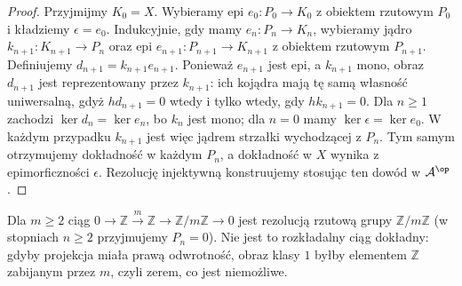 \begin{proof}
Przyjmijmy $K_0=X$. Wybieramy epi $e_0:P_0\to K_0$ z obiektem rzutowym $P_0$ i kładziemy $\epsilon=e_0$. Indukcyjnie, gdy mamy $e_n:P_n\to K_n$, wybieramy jądro $k_{n+1}:K_{n+1}\to P_n$ oraz epi $e_{n+1}:P_{n+1}\to K_{n+1}$ z obiektem rzutowym $P_{n+1}$. Definiujemy $d_{n+1}=k_{n+1}e_{n+1}$. Ponieważ $e_{n+1}$ jest epi, a $k_{n+1}$ mono, obraz $d_{n+1}$ jest reprezentowany przez $k_{n+1}$: ich kojądra mają tę samą własność uniwersalną, gdyż $hd_{n+1}=0$ wtedy i tylko wtedy, gdy $hk_{n+1}=0$.
Dla $n\ge1$ zachodzi $\ker d_n=\ker e_n$, bo $k_n$ jest mono; dla $n=0$ mamy $\ker\epsilon=\ker e_0$. W każdym przypadku $k_{n+1}$ jest więc jądrem strzałki wychodzącej z $P_n$. Tym samym otrzymujemy dokładność w każdym $P_n$, a dokładność w $X$ wynika z epimorficzności $\epsilon$. Rezolucję injektywną konstruujemy stosując ten dowód w $\mathcal A^{\op}$.
\end{proof}
\begin{przyklad}\label{cat:ex:cyclic-projective-resolution}
Dla $m\ge2$ ciąg $0\to\mathbb Z\xrightarrow{m}\mathbb Z\to\mathbb Z/m\mathbb Z\to0$ jest rezolucją rzutową grupy $\mathbb Z/m\mathbb Z$ (w stopniach $n\ge2$ przyjmujemy $P_n=0$). Nie jest to rozkładalny ciąg dokładny: gdyby projekcja miała prawą odwrotność, obraz klasy $1$ byłby elementem $\mathbb Z$ zabijanym przez $m$, czyli zerem, co jest niemożliwe.
\end{przyklad}


